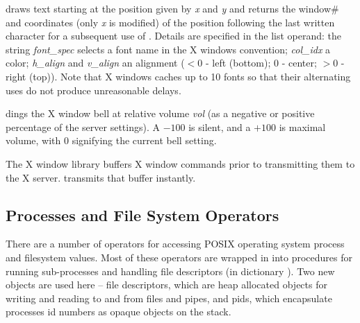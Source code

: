  draws text starting at the position given by \emph{x}
and \emph{y} and returns the window\# and coordinates (only \emph{x}
is modified) of the position following the last written character for
a subsequent use of . Details are specified in the list
operand: the string \emph{font\_spec} selects a font name in the X
windows convention; \emph{col\_idx} a color; \emph{h\_align} and
\emph{v\_align} an alignment ($<$0 - left (bottom); 0 - center; $>0$ -
right (top)). Note that X windows caches up to 10 fonts so that their
alternating uses do not produce unreasonable delays.

 dings the X window bell at relative volume \emph{vol} (as a
negative or positive percentage of the server settings). A $-100$ is
silent, and a $+100$ is maximal volume, with $0$ signifying the
current bell setting.

The X window library buffers X window commands prior to transmitting
them to the X server.  transmits that buffer instantly.

\subsection{Processes and File System Operators}

There are a number of operators for accessing POSIX operating system
process and filesystem values. Most of these operators are wrapped in
 into procedures for running sub-processes and
handling file descriptors (in dictionary ). Two new
objects are used here -- file descriptors, which are heap allocated
objects for writing and reading to and from files and pipes, and pids,
which encapsulate processes id numbers as opaque objects on the stack.

